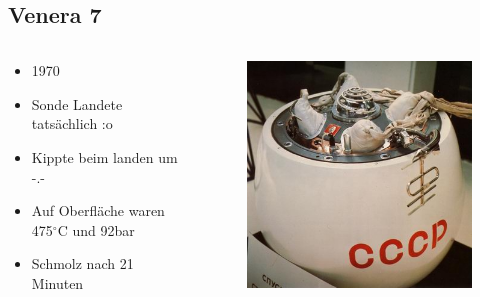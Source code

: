 \documentclass{beamer}
\begin{document}
	\subsection{Venera 7}
	\begin{frame}
		\begin{columns}
			\begin{column}{0.5\textwidth}
				\begin{itemize}
					\item 1970
					\item Sonde Landete tatsächlich :o
					\item Kippte beim landen um -.-
					\item Auf Oberfläche waren 475$^\circ$C und 92bar
					\item Schmolz nach 21 Minuten
				\end{itemize}
			\end{column}
			\begin{column}{0.4\textwidth}
				\begin{figure}[ht]
					\includegraphics[scale=0.4]{./images/venera_7}
				\end{figure}
			\end{column}
		\end{columns}
	\end{frame}
\end{document}
